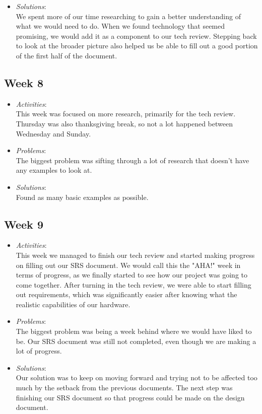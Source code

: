 \documentclass[compsoc,draftclsnofoot,onecolumn,10pt]{IEEEtran}
\begin{document}
\begin{itemize}
        \item \textit{Solutions}:\\
        We spent more of our time researching to gain a better understanding of what we would need to do. 
        When we found technology that seemed promising, we would add it as a component to our tech review.
        Stepping back to look at the broader picture also helped us be able to fill out a good portion of the first half of the document.
	\end{itemize}
   
\subsection{Week 8}
	\begin{itemize}
        \item \textit{Activities}:\\
        This week was focused on more research, primarily for the tech review. 
        Thursday was also thanksgiving break, so not a lot happened between Wednesday and Sunday. 
        \item \textit{Problems}:\\
        The biggest problem was sifting through a lot of research that doesn't have any examples to look at. 
        \item \textit{Solutions}:\\
        Found as many basic examples as possible.
	\end{itemize}
   
\subsection{Week 9}
	\begin{itemize}
        \item \textit{Activities}:\\
        This week we managed to finish our tech review and started making progress on filling out our SRS document.
        We would call this the "AHA!" week in terms of progress, as we finally started to see how our project was going to come together. 
        After turning in the tech review, we were able to start filling out requirements, which was significantly easier after knowing what the realistic capabilities of our hardware. 
        
        \item \textit{Problems}:\\
        The biggest problem was being a week behind where we would have liked to be. 
        Our SRS document was still not completed, even though we are making a lot of progress. 
       
        \item \textit{Solutions}:\\
        Our solution was to keep on moving forward and trying not to be affected too much by the setback from the previous documents. 
        The next step was finishing our SRS document so that progress could be made on the design document. 
	\end{itemize}
   
\end{document}
